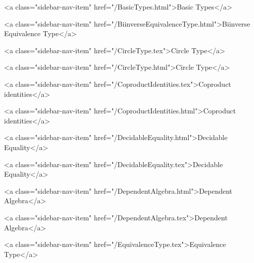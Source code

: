       
        
          <a class="sidebar-nav-item" href="/BasicTypes.html">Basic Types</a>
        
      
    
      
        
          <a class="sidebar-nav-item" href="/BiinverseEquivalenceType.html">Biinverse Equivalence Type</a>
        
      
    
      
        
          <a class="sidebar-nav-item" href="/CircleType.tex">Circle Type</a>
        
      
    
      
        
          <a class="sidebar-nav-item" href="/CircleType.html">Circle Type</a>
        
      
    
      
        
          <a class="sidebar-nav-item" href="/CoproductIdentities.tex">Coproduct identities</a>
        
      
    
      
        
          <a class="sidebar-nav-item" href="/CoproductIdentities.html">Coproduct identities</a>
        
      
    
      
        
          <a class="sidebar-nav-item" href="/DecidableEquality.html">Decidable Equality</a>
        
      
    
      
        
          <a class="sidebar-nav-item" href="/DecidableEquality.tex">Decidable Equality</a>
        
      
    
      
        
          <a class="sidebar-nav-item" href="/DependentAlgebra.html">Dependent Algebra</a>
        
      
    
      
        
          <a class="sidebar-nav-item" href="/DependentAlgebra.tex">Dependent Algebra</a>
        
      
    
      
        
          <a class="sidebar-nav-item" href="/EquivalenceType.tex">Equivalence Type</a>
        
